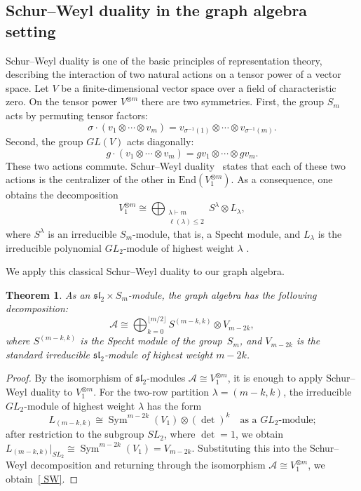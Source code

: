 \documentclass[12pt,reqno]{amsart}
\newtheorem{theorem}{Theorem}[section]
\begin{document}
\subsection{Schur--Weyl duality in the graph algebra setting}


Schur--Weyl duality is one of the basic principles of representation theory,
describing the interaction of two natural actions on a tensor power of a
vector space. Let $V$ be a finite-dimensional vector space over a field of
characteristic zero. On the tensor power
$
V^{\otimes m}
$
there are two symmetries. First, the group $S_m$ acts by permuting tensor
factors:
$$
\sigma\cdot(v_1\otimes\cdots\otimes v_m)
=
v_{\sigma^{-1}(1)}\otimes\cdots\otimes v_{\sigma^{-1}(m)}.
$$
Second, the group $GL(V)$ acts diagonally:
$$
g\cdot(v_1\otimes\cdots\otimes v_m)
=
gv_1\otimes\cdots\otimes gv_m.
$$
These two actions commute.
Schur--Weyl duality~\cite[Chapter~6]{FH} states that each of these two
actions is the centralizer of the other in $\mathrm{End}(V_1^{\otimes m})$.
As a consequence, one obtains the decomposition
$$
  V_1^{\otimes m}
  \cong
  \bigoplus_{\substack{\lambda \vdash m \\ \ell(\lambda) \le 2}}
  S^\lambda \otimes L_\lambda,
$$
where $S^\lambda$ is an irreducible $S_m$-module, that is, a Specht module,
and $L_\lambda$ is the irreducible polynomial $GL_2$-module of highest weight
$\lambda$ \cite[Theorem~9.1.2]{GW}.

We apply this classical Schur--Weyl duality to our graph algebra.

\begin{theorem}
  
  As an $\mathfrak{sl}_2 \times S_m$-module, the graph algebra has the
  following decomposition:
  \begin{equation}\label{ SW}
    \mathcal{A}
    \cong
    \bigoplus_{k=0}^{\lfloor m/2 \rfloor}
    S^{(m-k,k)} \otimes V_{m-2k},
  \end{equation}
  where $S^{(m-k,k)}$ is the Specht module of the group~$S_m$, and
  $V_{m-2k}$ is the standard irreducible $\mathfrak{sl}_2$-module of highest
  weight $m-2k$.
\end{theorem}

\begin{proof}
  By the isomorphism of $\mathfrak{sl}_2$-modules
  $\mathcal{A} \cong V_1^{\otimes m}$, it is enough to apply Schur--Weyl
  duality to $V_1^{\otimes m}$.
  For the two-row partition $\lambda = (m-k, k)$, the irreducible
  $GL_2$-module of highest weight $\lambda$ has the form
  $$
    L_{(m-k,k)}
    \cong
    \operatorname{Sym}^{m-2k}(V_1) \otimes (\det)^k
    \quad\text{as a } GL_2\text{-module;}
  $$
  after restriction to the subgroup $SL_2$, where $\det = 1$, we obtain
  $L_{(m-k,k)}\big|_{SL_2} \cong \operatorname{Sym}^{m-2k}(V_1) = V_{m-2k}$.
  Substituting this into the Schur--Weyl decomposition and returning through
  the isomorphism $\mathcal{A} \cong V_1^{\otimes m}$, we obtain~\eqref{ SW}.
\end{proof}
\end{document}

